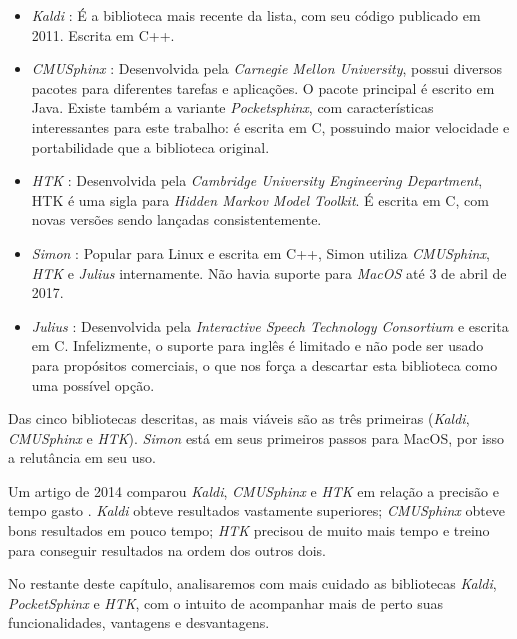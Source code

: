 \begin{itemize}
\item \emph{Kaldi} \citep{kaldi}: É a biblioteca mais recente da lista, com seu código publicado em 2011. Escrita em C++.

\item \emph{CMUSphinx} \citep{cmusphinx}: Desenvolvida pela \emph{Carnegie Mellon University}, possui diversos pacotes para diferentes tarefas e aplicações. O pacote principal é escrito em Java. Existe também a variante \emph{Pocketsphinx}, com características interessantes para este trabalho: é escrita em C, possuindo maior velocidade e portabilidade que a biblioteca original.

\item \emph{HTK} \citep{htk}: Desenvolvida pela \emph{Cambridge University Engineering Department}, HTK é uma sigla para \emph{Hidden Markov Model Toolkit}. É escrita em C, com novas versões sendo lançadas consistentemente.

\item \emph{Simon} \citep{Simon}: Popular para Linux e escrita em C++, Simon utiliza \emph{CMUSphinx}, \emph{HTK} e \emph{Julius} internamente. Não havia suporte para \emph{MacOS} até 3 de abril de 2017.

\item \emph{Julius} \citep{Julius}: Desenvolvida pela \emph{Interactive Speech Technology Consortium} e escrita em C. Infelizmente, o suporte para inglês é limitado e não pode ser usado para propósitos comerciais, o que nos força a descartar esta biblioteca como uma possível opção.
\end{itemize}

Das cinco bibliotecas descritas, as mais viáveis são as três primeiras (\emph{Kaldi}, \emph{CMUSphinx} e \emph{HTK}). \emph{Simon} está em seus primeiros passos para MacOS, por isso a relutância em seu uso.

Um artigo de 2014 comparou \emph{Kaldi}, \emph{CMUSphinx} e \emph{HTK} em relação a precisão e tempo gasto \citep{compareSpeech}. \emph{Kaldi} obteve resultados vastamente superiores; \emph{CMUSphinx} obteve bons resultados em pouco tempo; \emph{HTK} precisou de muito mais tempo e treino para conseguir resultados na ordem dos outros dois.

No restante deste capítulo, analisaremos com mais cuidado as bibliotecas \emph{Kaldi}, \emph{PocketSphinx} e \emph{HTK}, com o intuito de acompanhar mais de perto suas funcionalidades, vantagens e desvantagens.

